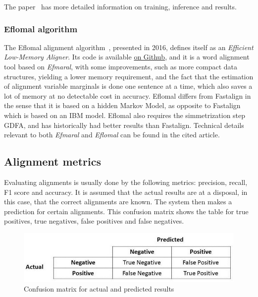 The paper~\cite{dyer-etal-2013-simple} has more detailed information on training, inference and results.

\subsubsection{Eflomal algorithm}

The Eflomal alignment algorithm~\cite{ostling2016efficient}, presented in 2016, defines itself as an \emph{Efficient Low-Memory Aligner}. Its code is available \href{https://github.com/robertostling/eflomal}{on Github}, and it is a word alignment tool based on \emph{Efmaral}, with some improvements, such as more compact data structures, yielding a lower memory requirement, and the fact that the estimation of alignment variable marginals is done one sentence at a time, which also saves a lot of memory at no detectable cost in accuracy. Eflomal differs from Fastalign in the sense that it is based on a hidden Markov Model, as opposite to Fastalign which is based on an IBM model. Eflomal also requires the simmetrization step GDFA, and has historically had better results than Fastalign. Technical details relevant to both \emph{Efmaral} and \emph{Eflomal} can be found in the cited article.

\subsection{Alignment metrics}\label{tra:metrics}

Evaluating alignments is usually done by the following metrics: precision, recall, F1 score and accuracy. It is assumed that the actual results are at a disposal, in this case, that the correct alignments are known. The system then makes a prediction for certain alignments. This confusion matrix shows the table for true positives, true negatives, false positives and false negatives.

\begin{figure}[!ht]
    \centering
    \includegraphics[width=12cm]{figures/precrec.jpeg}
    \caption{Confusion matrix for actual and predicted results}
\end{figure}

